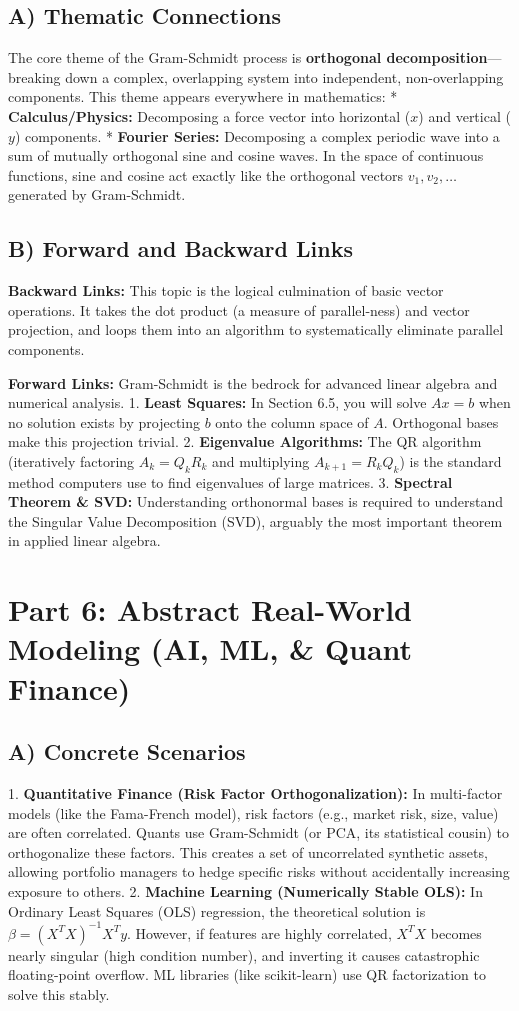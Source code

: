 \documentclass[11pt, letterpaper]{article}
\theoremstyle{definition}
\theoremstyle{remark}
\begin{document}
\subsection{A) Thematic Connections}
The core theme of the Gram-Schmidt process is \textbf{orthogonal decomposition}—breaking down a complex, overlapping system into independent, non-overlapping components. 
This theme appears everywhere in mathematics:
*   \textbf{Calculus/Physics:} Decomposing a force vector into horizontal ($x$) and vertical ($y$) components.
*   \textbf{Fourier Series:} Decomposing a complex periodic wave into a sum of mutually orthogonal sine and cosine waves. In the space of continuous functions, sine and cosine act exactly like the orthogonal vectors $v_1, v_2, \dots$ generated by Gram-Schmidt.

\subsection{B) Forward and Backward Links}
\textbf{Backward Links:} This topic is the logical culmination of basic vector operations. It takes the dot product (a measure of parallel-ness) and vector projection, and loops them into an algorithm to systematically eliminate parallel components.

\textbf{Forward Links:} Gram-Schmidt is the bedrock for advanced linear algebra and numerical analysis. 
1. \textbf{Least Squares:} In Section 6.5, you will solve $Ax = b$ when no solution exists by projecting $b$ onto the column space of $A$. Orthogonal bases make this projection trivial.
2. \textbf{Eigenvalue Algorithms:} The QR algorithm (iteratively factoring $A_k = Q_k R_k$ and multiplying $A_{k+1} = R_k Q_k$) is the standard method computers use to find eigenvalues of large matrices.
3. \textbf{Spectral Theorem \& SVD:} Understanding orthonormal bases is required to understand the Singular Value Decomposition (SVD), arguably the most important theorem in applied linear algebra.

\section{Part 6: Abstract Real-World Modeling (AI, ML, \& Quant Finance)}

\subsection{A) Concrete Scenarios}
1. \textbf{Quantitative Finance (Risk Factor Orthogonalization):} In multi-factor models (like the Fama-French model), risk factors (e.g., market risk, size, value) are often correlated. Quants use Gram-Schmidt (or PCA, its statistical cousin) to orthogonalize these factors. This creates a set of uncorrelated synthetic assets, allowing portfolio managers to hedge specific risks without accidentally increasing exposure to others.
2. \textbf{Machine Learning (Numerically Stable OLS):} In Ordinary Least Squares (OLS) regression, the theoretical solution is $\beta = (X^T X)^{-1} X^T y$. However, if features are highly correlated, $X^T X$ becomes nearly singular (high condition number), and inverting it causes catastrophic floating-point overflow. ML libraries (like scikit-learn) use QR factorization to solve this stably.
\end{document}

